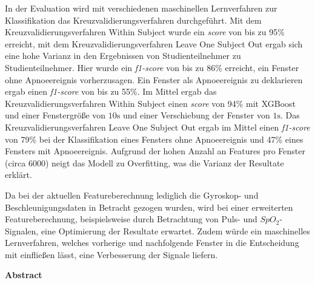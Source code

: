 In der Evaluation wird mit verschiedenen maschinellen Lernverfahren zur Klassifikation das Kreuzvalidierungsverfahren durchgeführt.
Mit dem Kreuzvalidierungsverfahren {\glqq Within Subject\grqq} wurde ein \textit{score} von bis zu 95\% erreicht, mit dem Kreuzvalidierungsverfahren {\glqq Leave One Subject Out\grqq} ergab sich eine hohe Varianz in den Ergebnissen von Studienteilnehmer zu Studienteilnehmer.
Hier wurde ein \textit{f1-score} von bis zu 86\% erreicht, ein Fenster ohne Apnoeereignis vorherzusagen. 
Ein Fenster als Apnoeereignis zu deklarieren ergab einen \textit{f1-score} von bis zu 55\%. 
Im Mittel ergab das Kreuzvalidierungsverfahren {\glqq Within Subject\grqq} einen \textit{score} von 94\% mit XGBoost und einer Fenstergröße von $10\si{\s}$ und einer Verschiebung der Fenster von $1\si{\s}$.
Das Kreuzvalidierungsverfahren {\glqq Leave One Subject Out\grqq} ergab im Mittel einen \textit{f1-score} von 79\% bei der Klassifikation eines Fensters ohne Apnoeereignis und 47\% eines Fensters mit Apnoeereignis.
Aufgrund der hohen Anzahl an Features pro Fenster (circa 6000) neigt das Modell zu Overfitting, was die Varianz der Resultate erklärt.

Da bei der aktuellen Featureberechnung lediglich die Gyroskop- und Beschleunigungsdaten in Betracht gezogen wurden, wird bei einer erweiterten Featureberechnung, beispielsweise      durch Betrachtung von Puls- und $SpO_2$-Signalen, eine Optimierung der Resultate erwartet.
Zudem würde ein maschinelles Lernverfahren, welches vorherige und nachfolgende Fenster in die Entscheidung mit einfließen lässt, eine Verbesserung der Signale liefern.



\cleardoublepage
\vspace*{1em}
\begin{center}
	\textbf{Abstract}
\end{center}

